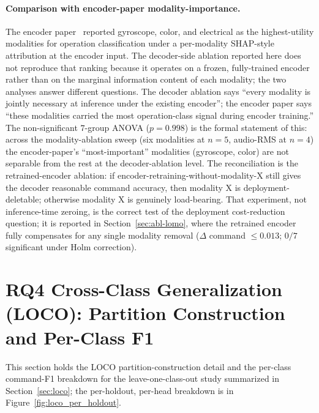 \documentclass[11pt,a4paper]{article}
\begin{document}
\paragraph{Comparison with encoder-paper modality-importance.} The encoder paper~\cite{encoder_paper} reported gyroscope, color, and electrical as the highest-utility modalities for operation classification under a per-modality SHAP-style attribution at the encoder input. The decoder-side ablation reported here does not reproduce that ranking because it operates on a frozen, fully-trained encoder rather than on the marginal information content of each modality; the two analyses answer different questions. The decoder ablation says ``every modality is jointly necessary at inference under the existing encoder''; the encoder paper says ``these modalities carried the most operation-class signal during encoder training.'' The non-significant $7$-group ANOVA ($p=0.998$) is the formal statement of this: across the modality-ablation sweep (six modalities at $n=5$, audio-RMS at $n=4$) the encoder-paper's ``most-important'' modalities (gyroscope, color) are not separable from the rest at the decoder-ablation level. The reconciliation is the retrained-encoder ablation: if encoder-retraining-without-modality-X still gives the decoder reasonable command accuracy, then modality X is deployment-deletable; otherwise modality X is genuinely load-bearing. That experiment, not inference-time zeroing, is the correct test of the deployment cost-reduction question; it is reported in Section~\ref{sec:abl-lomo}, where the retrained encoder fully compensates for any single modality removal ($\Delta$ command $\le 0.013$; $0/7$ significant under Holm correction).

\section{RQ4 Cross-Class Generalization (LOCO): Partition Construction and Per-Class F1}
\label{app:loco-detail}

This section holds the LOCO partition-construction detail and the per-class
command-F1 breakdown for the leave-one-class-out study summarized in
Section~\ref{sec:loco}; the per-holdout, per-head breakdown is in
Figure~\ref{fig:loco_per_holdout}.
\end{document}
